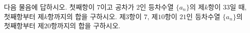 다음 물음에 답하시오.
 첫째항이 $7$이고 공차가 $2$인 등차수열 $\{a_n\}$의 제$k$항이 $33$일 때, 첫째항부터 제$k$항까지의 합을 구하시오.
 제$3$항이 $7$, 제$10$항이 $21$인 등차수열 $\{a_n\}$의 첫째항부터 제$20$항까지의 합을 구하시오.
